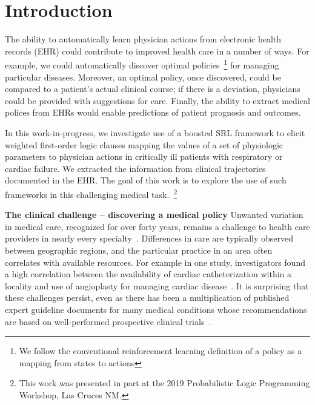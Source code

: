 \documentclass[letterpaper]{article} %
\begin{document}
\section{Introduction}
The ability to automatically learn physician actions from electronic health records (EHR) could contribute to improved health care in a number of ways. For example, we could automatically discover optimal policies~\footnote{We follow the conventional reinforcement learning definition of a policy as a mapping from states to actions} for managing particular diseases. Moreover, an optimal policy, once discovered, could be compared to a patient's actual clinical course; if there is a deviation, physicians could be provided with suggestions for care. Finally, the ability to extract medical polices from EHRs would enable predictions of patient prognosis and outcomes.

In this work-in-progress, we investigate use of a boosted SRL framework to elicit weighted first-order logic clauses mapping the values of a set of physiologic parameters to physician actions in critically ill patients with respiratory or cardiac failure. We extracted the information from clinical trajectories documented in the EHR. The goal of this work is to explore the use of such frameworks in this challenging medical task.~\footnote{This work was presented in part at the 2019 Probabilistic Logic Programming Workshop, Las Cruces NM.}


\textbf{The clinical challenge -- discovering a medical policy} Unwanted variation in medical care, recognized for over forty years, remains a challenge to health care providers in nearly every specialty~\cite{westert2018medical,karimi2017national,lilot2015variability}. Differences in care are typically observed between geographic regions, and the particular practice in an area often correlates with available resources. For example in one study, investigators found a high correlation between the availability of cardiac catheterization within a locality and use of angioplasty for managing cardiac disease~\cite{brownlee2010overtreated}. It is surprising that these challenges persist, even as there has been a multiplication of published expert guideline documents for many medical conditions whose recommendations are based on well-performed prospective clinical trials~\cite{weisz2007emergence}.
\end{document}
